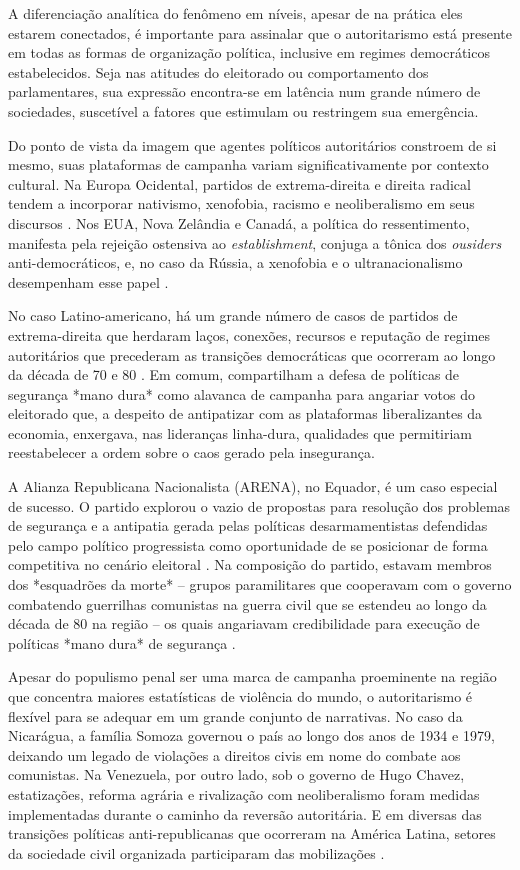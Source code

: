 \documentclass[
12pt,				%
openright,			%
twoside,			%
a4paper,			%
english,			%
french,				%
spanish,			%
brazil				%
]{abntex2}
\begin{document}
A diferenciação analítica do fenômeno em níveis, apesar de na prática eles estarem conectados, é importante para assinalar que o autoritarismo está presente em todas as formas de organização política, inclusive em regimes democráticos estabelecidos. Seja nas atitudes do eleitorado ou comportamento dos parlamentares, sua expressão encontra-se em latência num grande número de sociedades, suscetível a fatores que estimulam ou restringem sua emergência. 

Do ponto de vista da imagem que agentes políticos autoritários constroem de si mesmo, suas plataformas de campanha variam significativamente por contexto cultural. Na Europa Ocidental, partidos de extrema-direita e direita radical tendem a incorporar nativismo, xenofobia, racismo e neoliberalismo em seus discursos \cite{mudde2009populist}. Nos EUA, Nova Zelândia e Canadá, a política do ressentimento, manifesta pela rejeição ostensiva ao \emph{establishment}, conjuga a tônica dos \emph{ousiders} anti-democráticos, e, no caso da Rússia, a xenofobia e o ultranacionalismo desempenham esse papel \cite{norris2005radical}. 

No caso Latino-americano, há um grande número de casos de partidos de extrema-direita que herdaram laços, conexões, recursos e reputação de regimes autoritários que precederam as transições democráticas que ocorreram ao longo da década de 70 e 80 \cite{loxton2014authoritarian}. Em comum, compartilham a defesa de políticas de segurança *mano dura* como alavanca de campanha para angariar votos do eleitorado que, a despeito de antipatizar com as plataformas liberalizantes da economia, enxergava, nas lideranças linha-dura, qualidades que permitiriam reestabelecer a ordem sobre o caos gerado pela insegurança.

A Alianza Republicana Nacionalista (ARENA), no Equador, é um caso especial de sucesso. O partido explorou o vazio de propostas para resolução dos problemas de segurança e a antipatia gerada pelas políticas desarmamentistas defendidas pelo campo político progressista como oportunidade de se posicionar de forma competitiva no cenário eleitoral \cite{holland2013right}. Na composição do partido, estavam membros dos *esquadrões da morte* -- grupos paramilitares que cooperavam com o governo combatendo guerrilhas comunistas na guerra civil que se estendeu ao longo da década de 80 na região -- os quais angariavam credibilidade para execução de políticas *mano dura* de segurança \cite{loxton2014authoritarian}.

Apesar do populismo penal ser uma marca de campanha proeminente na região que concentra maiores estatísticas de violência do mundo, o autoritarismo é flexível para se adequar em um grande conjunto de narrativas. No caso da Nicarágua, a família Somoza governou o país ao longo dos anos de 1934 e 1979, deixando um legado de violações a direitos civis em nome do combate aos comunistas. Na Venezuela, por outro lado, sob o governo de Hugo Chavez, estatizações, reforma agrária e rivalização com neoliberalismo foram medidas implementadas durante o caminho da reversão autoritária. E em diversas das transições políticas anti-republicanas que ocorreram na América Latina, setores da sociedade civil organizada participaram das mobilizações \cite{valenzuela2004latin}.
\end{document}
